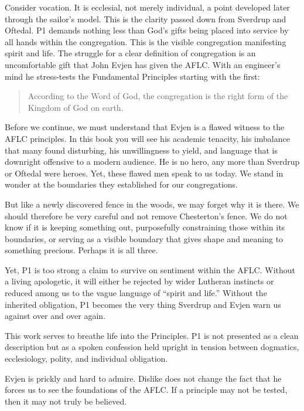 Consider vocation. It is ecclesial, not merely individual, a point developed later through the sailor's model. This is the clarity passed down from Sverdrup and Oftedal. P1 demands nothing less than God's gifts being placed into service by all hands within the congregation. This is the visible congregation manifesting spirit and life. The struggle for a clear definition of congregation is an uncomfortable gift that John Evjen has given the AFLC. With an engineer's mind he stress-tests the Fundamental Principles starting with the first:
 
\begin{quote}
According to the Word of God, the congregation is the right form of the Kingdom of God on earth. 
\end{quote}

Before we continue, we must understand that Evjen is a flawed witness to the AFLC principles. In this book you will see his academic tenacity, his imbalance that many found disturbing, his unwillingness to yield, and language that is downright offensive to a modern audience. He is no hero, any more than Sverdrup or Oftedal were heroes. Yet, these flawed men speak to us today. We stand in wonder at the boundaries they established for our congregations.

But like a newly discovered fence in the woods, we may forget why it is there. We should therefore be very careful and not remove Chesterton's fence. We do not know if it is keeping something out, purposefully constraining those within its boundaries, or serving as a visible boundary that gives shape and meaning to something precious. Perhaps it is all three.

Yet, P1 is too strong a claim to survive on sentiment within the AFLC. Without a living apologetic, it will either be rejected by wider Lutheran instincts or reduced among us to the vague language of “spirit and life.” Without the inherited obligation, P1 becomes the very thing Sverdrup and Evjen warn us against over and over again. 

This work serves to breathe life into the Principles. P1 is not presented as a clean description but as a spoken confession held upright in tension between dogmatics, ecclesiology, polity, and individual obligation.

Evjen is prickly and hard to admire. Dislike does not change the fact that he forces us to see the foundations of the AFLC. If a principle may not be tested, then it may not truly be believed.

